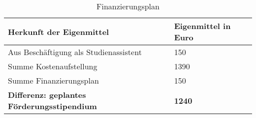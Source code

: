 \documentclass[a4paper,fleqn]{article}
\begin{document}
\begin{table}[ht]
  \centering
  \caption{Finanzierungsplan}
  \label{table:Finanzierungsplan}
  \begin{tabular}{|l|l|}
    \hline
    Herkunft der Eigenmittel         & Eigenmittel in Euro \\
    \hline
    Aus Besch\"aftigung als Studienassistent        & 150  \\
    \hline
    \hline
    Summe Kostenaufstellung                         &1390  \\
    Summe Finanzierungsplan                         & 150  \\
    \hline
    \textbf{Differenz: geplantes F\"orderungsstipendium}&\textbf{1240}\\
    \hline
  \end{tabular}
\end{table}
\end{document}
